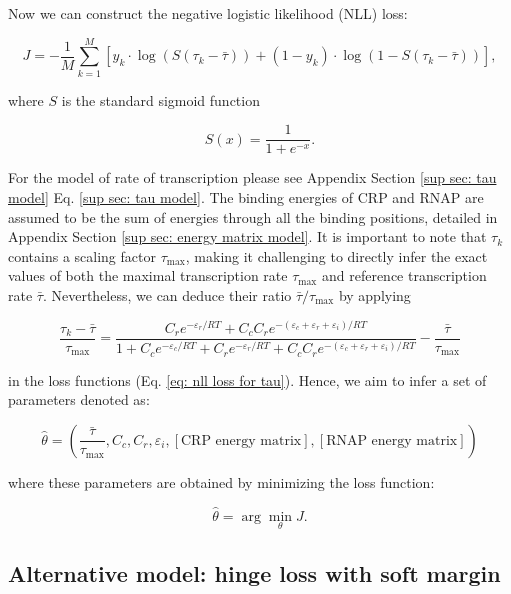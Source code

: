 \documentclass{article}
\begin{document}
Now we can construct the negative logistic likelihood (NLL) loss:

\begin{equation}\label{eq: nll loss for tau}
    J = -\frac{1}{M}\sum_{k=1}^M [y_k\cdot\log(S(\tau_k-\bar{\tau}))+(1-y_k)\cdot\log(1-S(\tau_k-\bar{\tau}))],
\end{equation}

\noindent where $S$ is the standard sigmoid function

\begin{equation}
    S(x)=\frac{1}{1+e^{-x}}.
\end{equation}

For the model of rate of transcription please see Appendix Section \ref{sup sec: tau model} Eq. \ref{sup sec: tau model}. The binding energies of CRP and RNAP are assumed to be the sum of energies through all the binding positions, detailed in Appendix Section \ref{sup sec: energy matrix model}. It is important to note that $\tau_k$ contains a scaling factor $\tau_{\text{max}}$, making it challenging to directly infer the exact values of both the maximal transcription rate $\tau_{\text{max}}$ and reference transcription rate $\bar{\tau}$. Nevertheless, we can deduce their ratio $\bar{\tau}/\tau_{\text{max}}$ by applying

\begin{equation}
    \frac{\tau_k-\bar{\tau}}{\tau_{\text{max}}} = \frac{C_r e^{-\varepsilon_r/RT}+C_c C_r e^{-(\varepsilon_c+\varepsilon_r+\varepsilon_i)/RT}}{1+C_c e^{-\varepsilon_c/RT}+C_r e^{-\varepsilon_r/RT}+C_c C_r e^{-(\varepsilon_c+\varepsilon_r+\varepsilon_i)/RT}} - \frac{\bar{\tau}}{\tau_{\text{max}}}
\end{equation}

\noindent in the loss functions (Eq. \ref{eq: nll loss for tau}). Hence, we aim to infer a set of parameters denoted as:

\begin{equation}
\hat{\theta} = \left(\frac{\bar{\tau}}{\tau_{\text{max}}},C_c,C_r,\varepsilon_i,[\text{CRP energy matrix}],[\text{RNAP energy matrix}]\right)
\end{equation}

\noindent where these parameters are obtained by minimizing the loss function:

\begin{equation}\label{eq: optimization problem}
\hat{\theta}=\arg\min_\theta J.
\end{equation}


\subsection{Alternative model: hinge loss with soft margin}\label{sec: hinge loss model}
\end{document}
